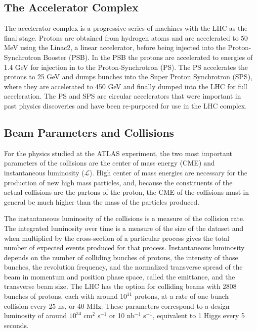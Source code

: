 \subsection{The Accelerator Complex}

The accelerator complex is a progressive series of machines with the LHC as the final stage.
Protons are obtained from hydrogen atoms and are accelerated to 50 MeV using the
Linac2, a linear accelerator, before being injected into the Proton-Synchrotron Booster (PSB). In
the PSB the protons are accelerated to energies of 1.4 GeV for injection
in to the Proton-Synchrotron (PS). The PS accelerates the protons to 25 GeV
and dumps bunches into the Super Proton Synchrotron (SPS), where they 
are accelerated to 450 GeV and finally dumped into the LHC for full acceleration. The PS and SPS are circular accelerators
that were important in past physics discoveries and have been re-purposed for use in the LHC complex. 

\subsection{Beam Parameters and Collisions} 

For the physics studied at the ATLAS experiment, the two most important parameters of
the collisions are the center of mass energy (CME)  and instantaneous luminosity ($\mathcal{L}$).
High center of mass energies are necessary for the production
of new high mass particles, and, because the constituents of the actual collisions
are the partons of the proton, the CME of the collisions must in general
be much higher than the mass of the particles produced. 

The instantaneous luminosity of the collisions is a measure of the
collision rate. The integrated luminosity over time is a measure of the size
of the dataset and when multiplied by the cross-section of a particular process
gives the total number of expected events produced for that process.
Instantaneous luminosity depends on the number of colliding bunches of protons,
the intensity of those bunches, the revolution
frequency, and the normalized transverse spread of the beam in momentum and position
phase space, called the emittance, and the transverse beam size. The LHC has the
option for colliding beams with 2808 bunches of protons, each with around $10^{11}$ protons,
at a rate of one bunch collision every 25 ns, or 40 MHz. These parameters correspond
to a design luminosity of around $10^{34}$ cm$^{2}$ s$^{-1}$ or 10 nb$^{-1}$ s$^{-1}$,
equivalent to 1 Higgs every 5 seconds.    

